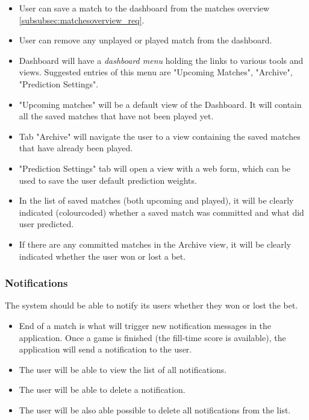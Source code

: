 \begin{itemize}
    \item User can save a match to the dashboard from the matches overview  \ref{subsubsec:matchesoverview_req}.
    \item User can remove any unplayed or played match from the dashboard.
    \item Dashboard will have a \emph{dashboard menu} holding the links to various tools and views. Suggested entries of this menu are "Upcoming Matches", "Archive", "Prediction Settings".
    \item "Upcoming matches" will be a default view of the Dashboard. It will contain all the saved matches that have not been played yet.
    \item Tab "Archive" will navigate the user to a view containing the saved matches that have already been played.
    \item "Prediction Settings" tab will open a view with a web form, which can be used to save the user default prediction weights.
    \item In the list of saved matches (both upcoming and played), it will be clearly indicated (colourcoded) whether a saved match was committed and what did user predicted.
    \item If there are any committed matches in the Archive view, it will be clearly indicated whether the user won or lost a bet. 
\end{itemize}

\subsubsection{Notifications}
\label{subsubsec:notifications_req}
The system should be able to notify its users whether they won or lost the bet. 
\begin{itemize}
    \item End of a match is what will trigger new notification messages in the application. Once a game is finished (the fill-time score is available), the application will send a notification to the user.
    \item The user will be able to view the list of all notifications.
    \item The user will be able to delete a notification.
    \item The user will be also able possible to delete all notifications from the list.
\end{itemize}

